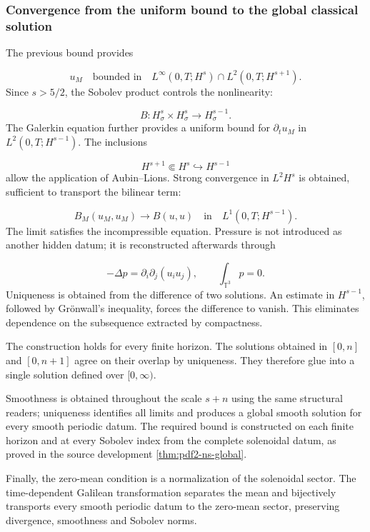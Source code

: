 \subsubsection{Convergence from the uniform bound to the global classical solution}
The previous bound provides\par
\[
u_M
\quad\text{bounded in}\quad
L^\infty(0,T;H^s)
\cap L^2(0,T;H^{s+1}).
\]
Since \(s>5/2\), the Sobolev product controls the nonlinearity:\par
\[
B:H^s_\sigma\times H^s_\sigma
\longrightarrow H^{s-1}_\sigma.
\]
The Galerkin equation further provides a uniform bound for \(\partial_tu_M\) in \(L^2(0,T;H^{s-1})\). The inclusions\par
\[
H^{s+1}\Subset H^s\hookrightarrow H^{s-1}
\]
allow the application of Aubin--Lions. Strong convergence in \(L^2H^s\) is obtained, sufficient to transport the bilinear term:\par
\[
B_M(u_M,u_M)\longrightarrow B(u,u)
\quad\text{in}\quad
L^1(0,T;H^{s-1}).
\]
The limit satisfies the incompressible equation. Pressure is not introduced as another hidden datum; it is reconstructed afterwards through\par
\[
-\Delta p=\partial_i\partial_j(u_i u_j),
\qquad
\int_{\mathbb T^3}p=0.
\]
Uniqueness is obtained from the difference of two solutions. An estimate in
\(H^{s-1}\), followed by Grönwall's inequality, forces the difference to
vanish. This eliminates dependence on the subsequence extracted by
compactness.\par
The construction holds for every finite horizon. The solutions obtained in \([0,n]\) and \([0,n+1]\) agree on their overlap by uniqueness. They therefore glue into a single solution defined over \([0,\infty)\).\par
Smoothness is obtained throughout the scale \(s+n\) using the same structural readers; uniqueness identifies all limits and produces a global smooth solution for every smooth periodic datum. The required bound is constructed on each finite horizon and at every Sobolev index from the complete solenoidal datum, as proved in the source development \cref{thm:pdf2-ns-global}.\par
Finally, the zero-mean condition is a normalization of the solenoidal sector. The time-dependent Galilean transformation separates the mean and bijectively transports every smooth periodic datum to the zero-mean sector, preserving divergence, smoothness and Sobolev norms.\par
{}
